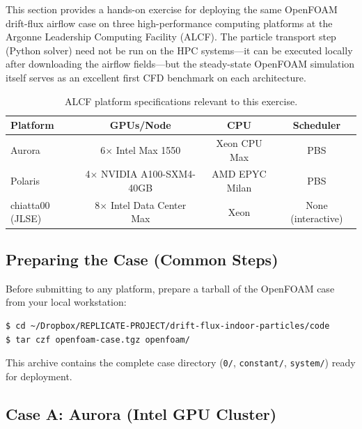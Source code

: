\documentclass[12pt]{article}
\begin{document}
This section provides a hands-on exercise for deploying the same OpenFOAM drift-flux airflow case on three high-performance computing platforms at the Argonne Leadership Computing Facility (ALCF). The particle transport step (Python solver) need not be run on the HPC systems---it can be executed locally after downloading the airflow fields---but the steady-state OpenFOAM simulation itself serves as an excellent first CFD benchmark on each architecture.

\begin{table}[H]
\centering
\caption{ALCF platform specifications relevant to this exercise.}
\begin{tabular}{lccc}
\toprule
\textbf{Platform} & \textbf{GPUs/Node} & \textbf{CPU} & \textbf{Scheduler} \\
\midrule
Aurora & 6$\times$ Intel Max 1550 & Xeon CPU Max & PBS \\
Polaris & 4$\times$ NVIDIA A100-SXM4-40GB & AMD EPYC Milan & PBS \\
chiatta00 (JLSE) & 8$\times$ Intel Data Center Max & Xeon & None (interactive) \\
\bottomrule
\end{tabular}
\end{table}

\subsection{Preparing the Case (Common Steps)}

Before submitting to any platform, prepare a tarball of the OpenFOAM case from your local workstation:

\begin{lstlisting}[language=bash]
$ cd ~/Dropbox/REPLICATE-PROJECT/drift-flux-indoor-particles/code
$ tar czf openfoam-case.tgz openfoam/
\end{lstlisting}

This archive contains the complete case directory (\texttt{0/}, \texttt{constant/}, \texttt{system/}) ready for deployment.

\subsection{Case A: Aurora (Intel GPU Cluster)}
\end{document}
